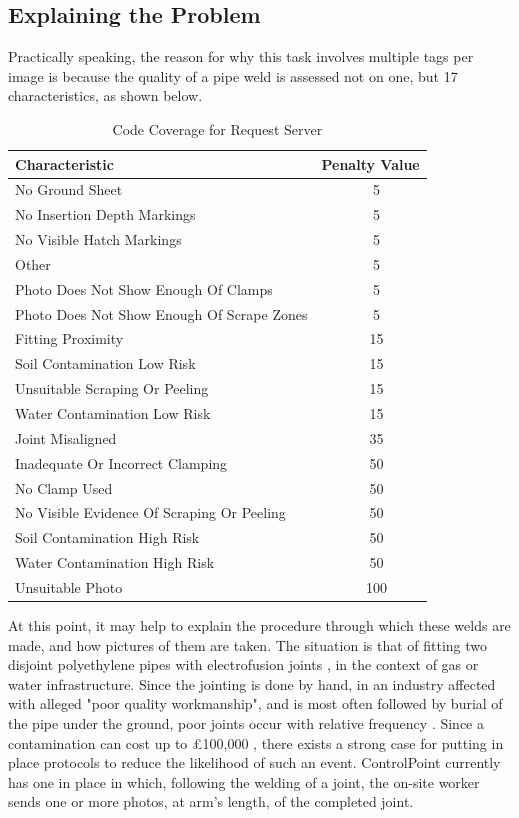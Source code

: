 \documentclass[a4paper,11pt]{article}
\begin{document}
\subsection{Explaining the Problem}

Practically speaking, the reason for why this task involves multiple tags per image is because the quality of a pipe weld is assessed not on one, but 17 characteristics, as shown below.

\begin{table}[h]
   \centering
    \begin{tabular}{|l|c|}
    \hline
    Characteristic                 & Penalty Value  \\ \hline
    No Ground Sheet  & ~  5 \\
    No Insertion Depth Markings  & ~ 5 \\
    No Visible Hatch Markings  & ~ 5 \\
    Other  & ~  5 \\
    Photo Does Not Show Enough Of Clamps  & ~ 5 \\
    Photo Does Not Show Enough Of Scrape Zones  & ~ 5 \\
    Fitting Proximity  & ~  15 \\
    Soil Contamination Low Risk  & ~ 15 \\
    Unsuitable Scraping Or Peeling  & ~ 15 \\
    Water Contamination Low Risk  & ~ 15 \\
    Joint Misaligned  & ~  35 \\
    Inadequate Or Incorrect Clamping  & ~ 50 \\
    No Clamp Used  & ~  50 \\
    No Visible Evidence Of Scraping Or Peeling  & ~ 50 \\
    Soil Contamination High Risk  & ~ 50 \\
    Water Contamination High Risk  & ~ 50 \\
    Unsuitable Photo  & ~ 100 \\
    \hline
    \end{tabular}
    \caption {Code Coverage for Request Server}
\end{table} 

At this point, it may help to explain the procedure through which these welds are made, and how pictures of them are taken. The situation is that of fitting two disjoint polyethylene pipes with electrofusion joints \cite{control-point}, in the context of gas or water infrastructure. Since the jointing is done by hand, in an industry affected with alleged "poor quality workmanship", and is most often followed by burial of the pipe under the ground, poor joints occur with relative frequency \cite{control-point}. Since a contamination can cost up to £100,000 \cite{control-point}, there exists a strong case for putting in place protocols to reduce the likelihood of such an event. ControlPoint currently has one in place in which, following the welding of a joint, the on-site worker sends one or more photos, at arm's length, of the completed joint. 
\end{document}
